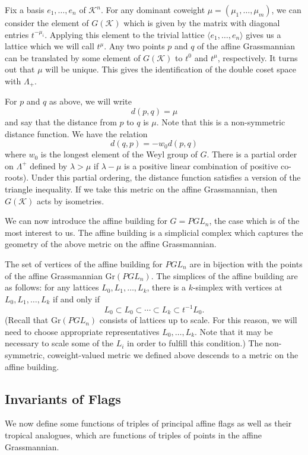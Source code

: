 \documentclass[10pt]{amsart}
\theoremstyle{definition}
\newcommand{\cK}{\mathcal{K}}
\newcommand{\Gr}{\mathrm{Gr}}
\begin{document}
Fix a basis $e_1, \dots, e_n$ of $\cK^n$. For any dominant coweight $\mu=(\mu_1, \dots, \mu_m)$, we can consider the element of $G(\cK)$ which is given by the matrix with diagonal entries $t^{-\mu_i}$. Applying this element to the trivial lattice $\langle e_1, \dots, e_n\rangle $ gives us a lattice which we will call $t^\mu$. Any two points $p$ and $q$ of the affine Grassmannian can be translated by some element of $G(\cK)$ to $t^0$ and $t^\mu$, respectively. It turns out that $\mu$ will be unique. This gives the identification of the double coset space with $\Lambda_+$.

For $p$ and $q$ as above, we will write 
\[
d(p,q) = \mu
\]
and say that the distance from $p$ to $q$ is $\mu$. Note that this is a non-symmetric distance function. We have the relation 
\[
d(q,p)=-w_0 d(p,q)
\]
 where $w_0$ is the longest element of the Weyl group of $G$. There is a partial order on $\Lambda^+$ defined by $\lambda > \mu$ if $\lambda - \mu$ is a positive linear combination of positive co-roots). Under this partial ordering, the distance function satisfies a version of the triangle inequality. If we take this metric on the affine Grassmannian, then $G(\cK)$ acts by isometries.

We can now introduce the affine building for $G=PGL_n$, the case which is of the most interest to us. The affine building is a simplicial complex which captures the geometry of the above metric on the affine Grassmannian.

The set of vertices of the affine building for $PGL_n$ are in bijection with the points of the affine Grassmannian $\Gr(PGL_n)$. The simplices of the affine building are as follows: for any lattices $L_0, L_1, \dots, L_k$, there is a $k$-simplex with vertices at $L_0, L_1, \dots, L_k$ if and only if 
\[
L_0 \subset L_0 \subset \cdots \subset L_k \subset t^{-1}L_0.
\]
(Recall that $\Gr(PGL_n)$ consists of lattices up to scale. For this reason, we will need to choose appropriate representatives $L_0, \dots, L_k$. Note that it may be necessary to scale some of the $L_i$ in order to fulfill this condition.) The non-symmetric, coweight-valued metric we defined above descends to a metric on the affine building.

\subsection{Invariants of Flags}

We now define some functions of triples of principal affine flags as well as their tropical analogues, which are functions of triples of points in the affine Grassmannian.
\end{document}
